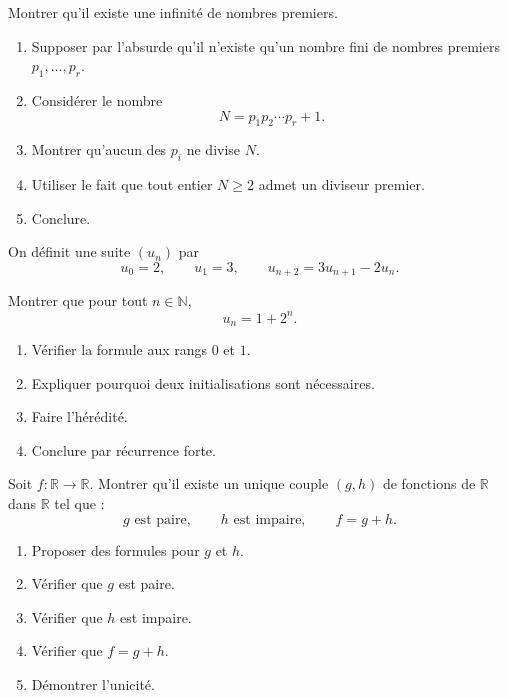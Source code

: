 \documentclass[11pt,a4paper]{article}
\newcommand{\N}{\mathbb{N}}
\newcommand{\R}{\mathbb{R}}
\begin{document}
\begin{exercicebox}
Montrer qu'il existe une infinité de nombres premiers.

\begin{enumerate}[label=\alph*)]
    \item Supposer par l'absurde qu'il n'existe qu'un nombre fini de nombres premiers \(p_1,\dots,p_r\).
    \item Considérer le nombre
    \[
    N=p_1p_2\cdots p_r+1.
    \]
    \item Montrer qu'aucun des \(p_i\) ne divise \(N\).
    \item Utiliser le fait que tout entier \(N\geq2\) admet un diviseur premier.
    \item Conclure.
\end{enumerate}
\end{exercicebox}

\begin{exercicebox}
On définit une suite \((u_n)\) par
\[
u_0=2,\qquad u_1=3,\qquad u_{n+2}=3u_{n+1}-2u_n.
\]

Montrer que pour tout \(n\in\N\),
\[
u_n=1+2^n.
\]

\begin{enumerate}[label=\alph*)]
    \item Vérifier la formule aux rangs \(0\) et \(1\).
    \item Expliquer pourquoi deux initialisations sont nécessaires.
    \item Faire l'hérédité.
    \item Conclure par récurrence forte.
\end{enumerate}
\end{exercicebox}

\begin{exercicebox}
Soit \(f:\R\to\R\). Montrer qu'il existe un unique couple \((g,h)\) de fonctions de \(\R\) dans \(\R\) tel que :
\[
g \text{ est paire},\qquad h \text{ est impaire},\qquad f=g+h.
\]

\begin{enumerate}[label=\alph*)]
    \item Proposer des formules pour \(g\) et \(h\).
    \item Vérifier que \(g\) est paire.
    \item Vérifier que \(h\) est impaire.
    \item Vérifier que \(f=g+h\).
    \item Démontrer l'unicité.
\end{enumerate}
\end{exercicebox}
\end{document}
